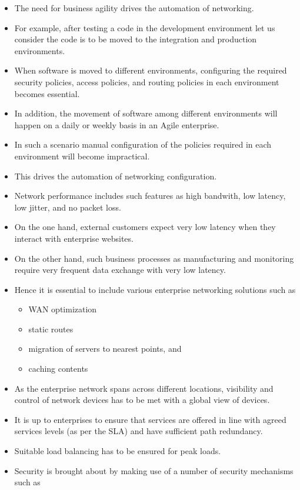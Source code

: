 \documentclass[a4paper, 12pt]{article}
\begin{document}
\begin{itemize}
\begin{itemize}
\end{itemize}
\item
The need for business agility drives the automation of networking.
\item
For example, after testing a code in the development environment let us consider the code is to be moved to the integration and production environments.
\item
When software is moved to different environments, configuring the required security policies, access policies, and routing policies in each environment becomes essential.
\item
In addition, the movement of software among different environments will happen on a daily or weekly basis in an Agile enterprise. 
\item
In such a scenario manual configuration of the policies required in each environment will become impractical. 
\item
This drives the automation of networking configuration.
\item
Network performance includes such features as high bandwith, low latency, low jitter, and no packet loss.
\item
On the one hand, external customers expect very low latency when they interact with enterprise websites.
\item
On the other hand, such business processes as manufacturing and monitoring require very frequent data exchange with very low latency.
\item
Hence it is essential to include various enterprise networking solutions such as
\begin{itemize}
\item
WAN optimization
\item
static routes
\item
migration of servers to nearest points, and
\item
caching contents
\end{itemize}
\item
As the enterprise network spans across different locations, visibility and control of network devices has to be met with a global view of devices.
\item
It is up to enterprises to ensure that services are offered in line with agreed services levels (as per the SLA) and have sufficient path redundancy.
\item
Suitable load balancing has to be ensured for peak loads.
\item
Security is brought about by making use of a number of security mechanisms such as

\end{itemize}
\end{document}

